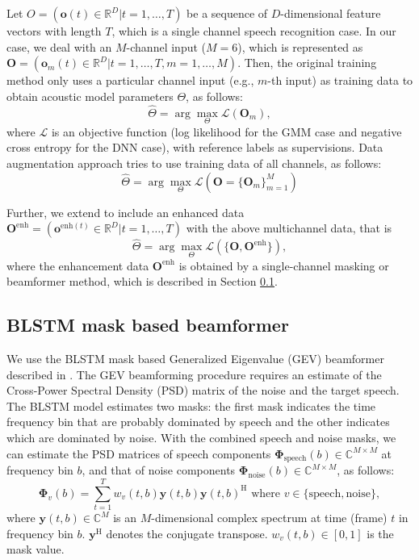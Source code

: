 \documentclass[a4paper]{article}
\begin{document}
Let $O = (\mathbf{o} (t) \in \mathbb{R} ^D | t=1, \dots, T)$ be a sequence of $D$-dimensional feature vectors with length $T$, which is a single channel speech recognition case. 
In our case, we deal with an $M$-channel input ($M=6$), which is represented as $\mathbf{O} = (\mathbf{o} _{m} (t) \in \mathbb{R} ^D | t=1, \dots, T, m =1, \dots, M)$.
Then, the original training method only uses a particular channel input (e.g., $m$-th input) as training data to obtain acoustic model parameters $\Theta$, as follows:
\begin{equation}
 \hat{\Theta} = \arg \max _{\Theta} \mathcal{L} (\mathbf{O}_m),
\end{equation}
where $\mathcal{L}$ is an objective function (log likelihood for the GMM case and negative cross entropy for the DNN case), with reference labels as supervisions.
Data augmentation approach tries to use training data of all channels, as follows:
\begin{equation}
 \hat{\Theta} = \arg \max _{\Theta} \mathcal{L} (\mathbf{O} = \{\mathbf{O}_m\} _{m=1}^M)
\end{equation}

Further, we extend to include an enhanced data $\mathbf{O} ^{\text{enh}} = (\mathbf{o} ^{\text{enh} (t)} \in \mathbb{R} ^D | t=1, \dots, T)$ with the above multichannel data, that is
\begin{equation}
 \hat{\Theta} = \arg \max _{\Theta} \mathcal{L} (\{\mathbf{O}, \mathbf{O} ^{\text{enh}}\}),
\end{equation}
where the enhancement data $\mathbf{O} ^{\text{enh}}$ is obtained by a single-channel masking or beamformer method, which is described in Section \ref{sec:blstm}.

\subsection{BLSTM mask based beamformer}
\label{sec:blstm}
We use the BLSTM mask based Generalized Eigenvalue (GEV) beamformer described in \cite{nn-gev}. The GEV beamforming procedure requires an estimate of the Cross-Power Spectral Density (PSD) matrix of the noise and the target speech. The BLSTM model estimates two masks: the first mask indicates the time frequency bin that are probably dominated by speech and the other indicates which are dominated by noise. 
With the combined speech and noise masks, we can estimate the PSD matrices of speech components $\mathbf{\Phi}_{\text{speech}}(b) \in \mathbb{C} ^{M\times M}$ at frequency bin $b$, and that of noise components $\mathbf{\Phi}_{\text{noise}} (b) \in \mathbb{C} ^{M \times M}$, as follows:
\begin{equation}
\mathbf{\Phi}_{v} (b) = \sum\limits_{t=1}^T w_v(t,b)\mathbf{y}(t, b)\mathbf{y}(t, b)^\textrm{H} \textrm{ where } v \in \{\text{speech}, \text{noise}\},
\end{equation}
where $\mathbf{y}(t, b) \in \mathbb{C} ^{M}$ is an $M$-dimensional complex spectrum at time (frame) $t$ in frequency bin $b$.
$\mathbf{y}^\textrm{H}$ denotes the conjugate transpose.
$w_v(t,b) \in [0, 1]$ is the mask value.
\end{document}
